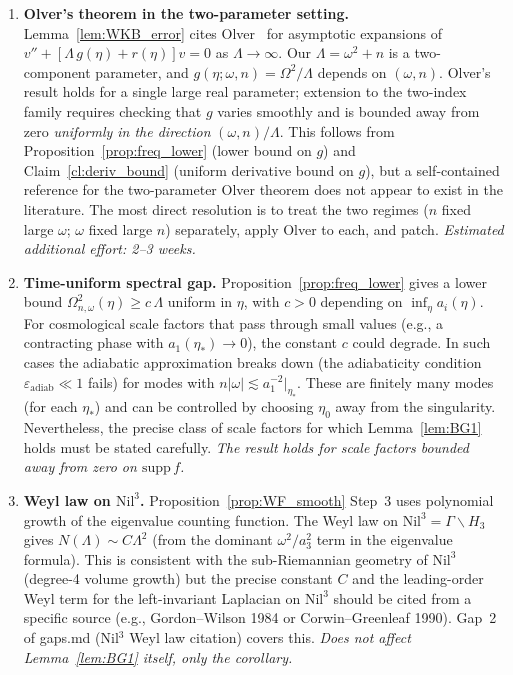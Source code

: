 \documentclass[11pt, a4paper]{article}
\newcommand{\Nil}{\mathrm{Nil}^3}
\newcommand{\om}{\omega}
\newcommand{\Lam}{\Lambda}
\begin{document}
\begin{enumerate}[label=G1.\arabic*]

\item \label{gap:Olver_two_param}
  \textbf{Olver's theorem in the two-parameter setting.}
  Lemma~\ref{lem:WKB_error} cites Olver~\cite{Olver74} for
  asymptotic expansions of $v'' + [\Lam\,g(\eta) + r(\eta)]v = 0$
  as $\Lam \to \infty$.
  Our $\Lam = \om^2 + n$ is a two-component parameter,
  and $g(\eta; \om, n) = \Omega^2/\Lam$ depends on $(\om, n)$.
  Olver's result holds for a single large real parameter;
  extension to the two-index family requires checking that $g$
  varies smoothly and is bounded away from zero \emph{uniformly in the direction}
  $(\om, n)/\Lam$.
  This follows from Proposition~\ref{prop:freq_lower} (lower bound on $g$)
  and Claim~\ref{cl:deriv_bound} (uniform derivative bound on $g$),
  but a self-contained reference for the two-parameter Olver theorem does not
  appear to exist in the literature.
  The most direct resolution is to treat the two regimes ($n$ fixed large $\om$;
  $\om$ fixed large $n$) separately, apply Olver to each, and patch.
  \emph{Estimated additional effort: 2--3 weeks.}

\item \label{gap:spectral_gap_time}
  \textbf{Time-uniform spectral gap.}
  Proposition~\ref{prop:freq_lower} gives a lower bound
  $\Omega_{n,\om}^2(\eta) \geq c\,\Lam$ uniform in $\eta$,
  with $c > 0$ depending on $\inf_\eta a_i(\eta)$.
  For cosmological scale factors that pass through small values
  (e.g., a contracting phase with $a_1(\eta_*) \to 0$),
  the constant $c$ could degrade.
  In such cases the adiabatic approximation breaks down
  (the adiabaticity condition $\varepsilon_{\mathrm{adiab}} \ll 1$ fails)
  for modes with $n |\om| \lesssim a_1^{-2}|_{\eta_*}$.
  These are finitely many modes (for each $\eta_*$) and can be controlled
  by choosing $\eta_0$ away from the singularity.
  Nevertheless, the precise class of scale factors for which
  Lemma~\ref{lem:BG1} holds must be stated carefully.
  \emph{The result holds for scale factors bounded away from zero
  on $\mathrm{supp}\,f$.}

\item \label{gap:Weyl_law}
  \textbf{Weyl law on $\Nil$.}
  Proposition~\ref{prop:WF_smooth} Step~3 uses polynomial growth
  of the eigenvalue counting function.
  The Weyl law on $\Nil = \Gamma \backslash H_3$ gives
  $N(\Lam) \sim C \Lam^2$ (from the dominant $\om^2/a_3^2$ term
  in the eigenvalue formula).
  This is consistent with the sub-Riemannian geometry of $\Nil$
  (degree-4 volume growth) but the precise constant $C$ and
  the leading-order Weyl term for the left-invariant Laplacian on $\Nil$
  should be cited from a specific source
  (e.g., Gordon--Wilson 1984 or Corwin--Greenleaf 1990).
  Gap~2 of gaps.md (Nil$^3$ Weyl law citation) covers this.
  \emph{Does not affect Lemma~\ref{lem:BG1} itself, only the corollary.}


\end{enumerate}
\end{document}
